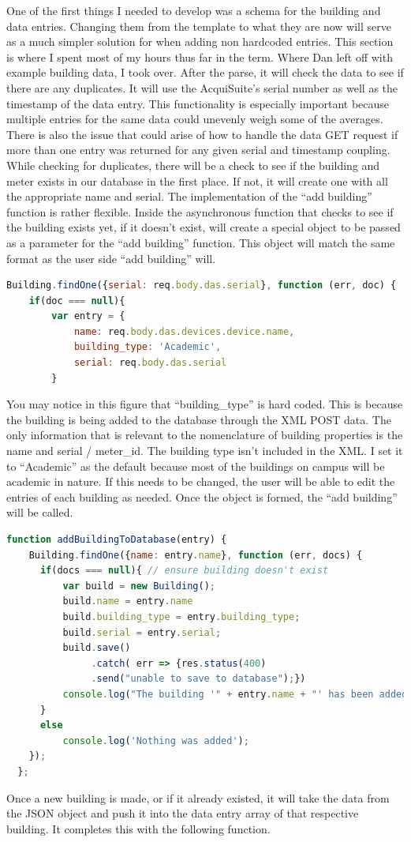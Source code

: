 \documentclass[letterpaper,10pt,serif,draftclsnofoot,onecolumn,compsoc,titlepage]{IEEEtran}
\begin{document}
One of the first things I needed to develop was a schema for the building and data entries. Changing them from the template to what they are now will serve as a much simpler solution for when adding non hardcoded entries.
This section is where I spent most of my hours thus far in the term. Where Dan left off with example building data, I took over.  After the parse, it will check the data to see if there are any duplicates. It will use the AcquiSuite's serial number as well as the timestamp of the data entry. This functionality is especially important because multiple entries for the same data could unevenly weigh some of the averages. There is also the issue that could arise of how to handle the data GET request if more than one entry was returned for any given serial and timestamp coupling. 
While checking for duplicates, there will be a check to see if the building and meter exists in our database in the first place. If not, it will create one with all the appropriate name and serial. The implementation of the ``add building'' function is rather flexible. Inside the asynchronous function that checks to see if the building exists yet, if it doesn't exist, will create a special object to be passed as a parameter for the ``add building'' function. This object will match the same format as the user side ``add building'' will. \\
\begin{lstlisting}[language=JavaScript]
Building.findOne({serial: req.body.das.serial}, function (err, doc) {
	if(doc === null){
		var entry = {
			name: req.body.das.devices.device.name,
			building_type: 'Academic',
			serial: req.body.das.serial
		}
\end{lstlisting}
\noindent You may notice in this figure that ``building\_type'' is hard coded. This is because the building is being added to the database through the XML POST data. The only information that is relevant to the nomenclature of building properties is the name and serial / meter\_id. The building type isn't included in the XML. I set it to ``Academic'' as the default because most of the buildings on campus will be academic in nature. If this needs to be changed, the user will be able to edit the entries of each building as needed. Once the object is formed, the ``add building'' will be called. \\
\begin{lstlisting}[language=JavaScript]
function addBuildingToDatabase(entry) {
    Building.findOne({name: entry.name}, function (err, docs) {
	  if(docs === null){ // ensure building doesn't exist
		  var build = new Building();
		  build.name = entry.name
		  build.building_type = entry.building_type;
		  build.serial = entry.serial;
		  build.save()
			   .catch( err => {res.status(400)
			   .send("unable to save to database");})
		  console.log("The building '" + entry.name + "' has been added.");
	  }
	  else
		  console.log('Nothing was added');     
	});
  };

\end{lstlisting}
\noindent Once a new building is made, or if it already existed, it will take the data from the JSON object and push it into the data entry array of that respective building. It completes this with the following function.
\end{document}
